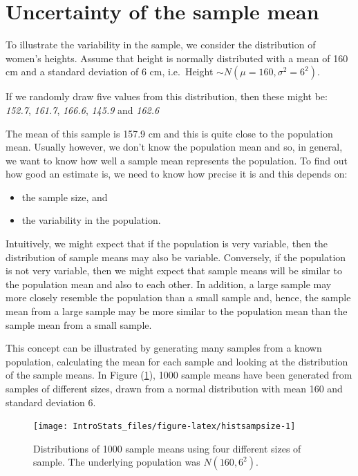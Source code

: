 \documentclass[
  oneside]{krantz}
\providecommand{\tightlist}{%
  \setlength{\itemsep}{0pt}\setlength{\parskip}{0pt}}
\begin{document}
\hypertarget{uncertainty-of-the-sample-mean}{%
\section{Uncertainty of the sample mean}\label{uncertainty-of-the-sample-mean}}

To illustrate the variability in the sample, we consider the distribution of women's heights. Assume that height is normally distributed with a mean of 160 cm and a standard deviation of 6 cm, i.e.~Height \(\sim N(\mu=160, \sigma^2=6^2)\).

If we randomly draw five values from this distribution, then these might be:
\emph{152.7}, \emph{161.7}, \emph{166.6}, \emph{145.9} and \emph{162.6}

The mean of this sample is 157.9 cm and this is quite close to the population mean. Usually however, we don't know the population mean and so, in general, we want to know how well a sample mean represents the population. To find out how good an estimate is, we need to know how precise it is and this depends on:

\begin{itemize}
\tightlist
\item
  the sample size, and
\item
  the variability in the population.
\end{itemize}

Intuitively, we might expect that if the population is very variable, then the distribution of sample means may also be variable. Conversely, if the population is not very variable, then we might expect that sample means will be similar to the population mean and also to each other. In addition, a large sample may more closely resemble the population than a small sample and, hence, the sample mean from a large sample may be more similar to the population mean than the sample mean from a small sample.

This concept can be illustrated by generating many samples from a known population, calculating the mean for each sample and looking at the distribution of the sample means. In Figure (\ref{fig:histsampsize}), 1000 sample means have been generated from samples of different sizes, drawn from a normal distribution with mean 160 and standard deviation 6.

\begin{figure}[!htb]

{\centering \texttt{[image: IntroStats\_files/figure-latex/histsampsize-1]} 

}

\caption{Distributions of 1000 sample means using four different sizes of sample. The underlying population was $N(160,6^2)$.}\label{fig:histsampsize}
\end{figure}
\end{document}
